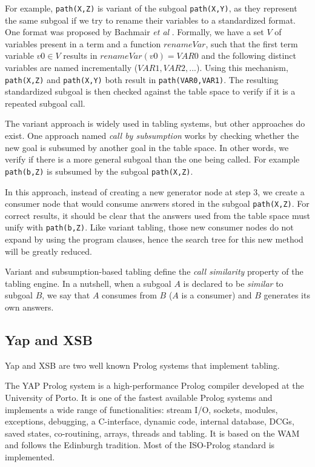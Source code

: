 For example, \texttt{path(X,Z)} is variant of the subgoal \texttt{path(X,Y)}, as they represent the same subgoal if we try
to rename their variables to a standardized format. One format was proposed by Bachmair \textit{et al} \cite{Bachmair-93}. Formally,
we have a set $V$ of variables present in a term and a function $renameVar$, such that the first term variable $v0 \in V$
results in $renameVar(v0) = VAR0$ and the following distinct variables are named incrementally ($VAR1, VAR2, ...$).
Using this mechanism, \texttt{path(X,Z)} and \texttt{path(X,Y)} both result in \texttt{path(VAR0,VAR1)}. The resulting
standardized subgoal is then checked against the table space to verify if it is a repeated subgoal call.

The variant approach is widely used in tabling systems, but other approaches do exist. One approach named
\textit{call by subsumption} works by checking whether the new goal is subsumed by another goal in the table space.
In other words, we verify if there is a more general subgoal than the one being called. For example
\texttt{path(b,Z)} is subsumed by the subgoal \texttt{path(X,Z)}.

In this approach, instead of creating a new generator node at step 3, we create a consumer node that would consume
answers stored in the subgoal \texttt{path(X,Z)}. For correct results, it should be clear that the answers used
from the table space must unify with \texttt{path(b,Z)}. Like variant tabling, those new consumer nodes do not expand
by using the program clauses, hence the search tree for this new method will be greatly reduced.

Variant and subsumption-based tabling define the \emph{call similarity} property of the tabling engine. In
a nutshell, when a subgoal $A$ is declared to be \emph{similar} to subgoal $B$, we say that $A$ consumes from
$B$ ($A$ is a consumer) and $B$ generates its own answers.

  \subsection{Yap and XSB}
  
  Yap \cite{system-yap} and XSB \cite{system-xsb} are two well known Prolog systems that implement tabling.
  
  The YAP Prolog system is a high-performance Prolog compiler developed at the University of Porto.
  It is one of the fastest available Prolog systems and implements a wide range of functionalities: 
  stream I/O, sockets, modules, exceptions, debugging, a C-interface, dynamic code, internal database,
  DCGs, saved states, co-routining, arrays, threads and tabling.
  It is based on the WAM and follows the Edinburgh tradition. Most of the ISO-Prolog standard is implemented.
  
